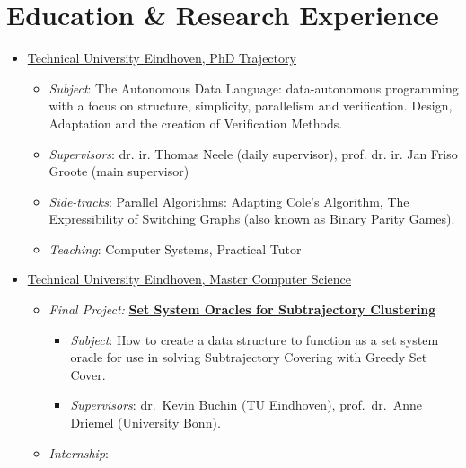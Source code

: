 \documentclass[11pt]{article}
\begin{document}
	
	\section*{Education \& Research Experience}
	\begin{itemize}
		\item \underline{Technical University Eindhoven, PhD Trajectory} \hfill\textit{\color{Blue}{10/2021-current}}
		\begin{itemize}
			\item \textit{Subject}: The Autonomous Data Language: data-autonomous programming with a focus on structure, simplicity, parallelism and verification. Design, Adaptation and the creation of Verification Methods.
			\item \textit{Supervisors}: dr. ir. Thomas Neele (daily supervisor), prof. dr. ir. Jan Friso Groote (main supervisor)
			\item \textit{Side-tracks}: Parallel Algorithms: Adapting Cole's Algorithm, The Expressibility of Switching Graphs  (also known as Binary Parity Games).
			\item \textit{Teaching}: Computer Systems, Practical Tutor\hfill \textit{\color{Blue}{2022-2024}}\\
			\textit{\color{darkgray}{Leading practical sessions and the grading therein, designing exam questions, efforts in further developing the course.}}
		\end{itemize}
		\item \underline{Technical University Eindhoven, Master Computer Science} \hfill \textit{\color{Blue}{09/2018-08/2021}}
		\begin{itemize}[noitemsep, nolistsep]
			\item \emph{Final Project:} \textbf{\href{https://research.tue.nl/en/studentTheses/set-system-oracles-for-subtrajectory-clustering}{Set System Oracles for Subtrajectory Clustering}}
			\begin{itemize}
				\item \emph{Subject}: How to create a data structure to function as a set system oracle for use in solving Subtrajectory Covering with Greedy Set Cover.
				\item \emph{Supervisors}: dr.~Kevin Buchin (TU Eindhoven), prof.~dr.~Anne Driemel (University Bonn).
			\end{itemize}
			\item \emph{Internship}:

\end{itemize}
\end{itemize}
\end{document}
